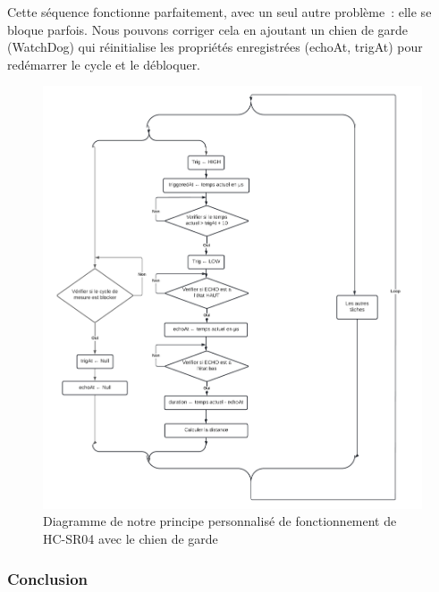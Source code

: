 \FloatBarrier

Cette séquence fonctionne parfaitement, avec un seul autre problème : elle se bloque parfois.
Nous pouvons corriger cela en ajoutant un chien de garde (WatchDog) qui réinitialise les propriétés enregistrées (echoAt, trigAt) pour redémarrer le cycle et le débloquer. 

\begin{figure}[!htbp]
    \centering
    \includegraphics[height=.8\textheight, width=\linewidth]{assets/HC-SR04/our working principal with watchdog.png}
    \caption{Diagramme de notre principe personnalisé de fonctionnement de HC-SR04 avec le chien de garde}
\end{figure}

\FloatBarrier







\subsubsection{Conclusion}


